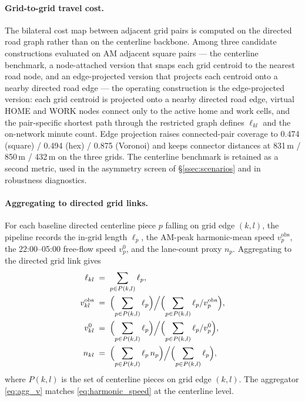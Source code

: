\documentclass[12pt]{article}
\newcommand{\obs}{\mathrm{obs}}
\begin{document}
\paragraph{Grid-to-grid travel cost.}\label{ssec:rawgrid_step}
The bilateral cost map between adjacent grid pairs is computed on
the directed road graph rather than on the centerline backbone.
Among three candidate constructions evaluated on AM adjacent square
pairs --- the centerline benchmark, a node-attached version that
snaps each grid centroid to the nearest road node, and an
edge-projected version that projects each centroid onto a nearby
directed road edge --- the operating construction is the
edge-projected version: each grid centroid is projected onto a
nearby directed road edge, virtual HOME and WORK nodes connect only
to the active home and work cells, and the pair-specific shortest
path through the restricted graph defines $\ell_{kl}$ and the
on-network minute count.  Edge projection raises connected-pair
coverage to 0.474 (square) / 0.494 (hex) / 0.875 (Voronoi) and
keeps connector distances at 831\,m / 850\,m / 432\,m on the three
grids.  The centerline benchmark is retained as a second metric,
used in the asymmetry screen of \S\ref{ssec:scenarios} and in
robustness diagnostics.

\paragraph{Aggregating to directed grid links.}
For each baseline directed centerline piece $p$ falling on grid edge
$(k,l)$, the pipeline records the in-grid length $\ell_p$, the
AM-peak harmonic-mean speed $v_p^{\obs}$, the 22:00--05:00 free-flow
speed $v^{0}_{p}$, and the lane-count proxy $n_p$.  Aggregating to
the directed grid link gives
\begin{align}
  \ell_{kl}
    &\;=\;\sum_{p\in P(k,l)}\ell_{p},
  \label{eq:agg_ell}\\
  v_{kl}^{\obs}
    &\;=\;\Bigl(\sum_{p\in P(k,l)}\ell_p\Bigr)\Big/
       \Bigl(\sum_{p\in P(k,l)}\ell_p / v_p^{\obs}\Bigr),
  \label{eq:agg_v}\\
  v^{0}_{kl}
    &\;=\;\Bigl(\sum_{p\in P(k,l)}\ell_p\Bigr)\Big/
       \Bigl(\sum_{p\in P(k,l)}\ell_p / v^{0}_p\Bigr),\\
  n_{kl}
    &\;=\;\Bigl(\sum_{p\in P(k,l)}\ell_p\,n_p\Bigr)\Big/
       \Bigl(\sum_{p\in P(k,l)}\ell_p\Bigr),
\end{align}
where $P(k,l)$ is the set of centerline pieces on grid edge $(k,l)$.
The aggregator \eqref{eq:agg_v} matches \eqref{eq:harmonic_speed} at
the centerline level.
\end{document}
